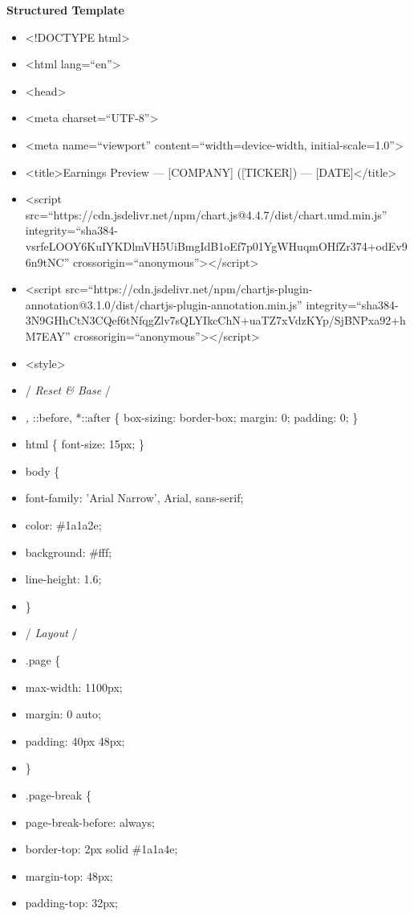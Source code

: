 \documentclass[11pt]{article}
\begin{document}
\textbf{Structured Template}
\begin{itemize}[leftmargin=*,itemsep=2pt,topsep=2pt]
\item {} <!DOCTYPE html>
\item {} <html lang=``en''>
\item {} <head>
\item {} <meta charset=``UTF-8''>
\item {} <meta name=``viewport'' content=``width=device-width, initial-scale=1.0''>
\item {} <title>Earnings Preview — [COMPANY] ([TICKER]) — [DATE]</title>
\item {} <script src=``https://cdn.jsdelivr.net/npm/chart.js@4.4.7/dist/chart.umd.min.js'' integrity=``sha384-vsrfeLOOY6KuIYKDlmVH5UiBmgIdB1oEf7p01YgWHuqmOHfZr374+odEv96n9tNC'' crossorigin=``anonymous''></script>
\item {} <script src=``https://cdn.jsdelivr.net/npm/chartjs-plugin-annotation@3.1.0/dist/chartjs-plugin-annotation.min.js'' integrity=``sha384-3N9GHhCtN3CQef6tNfqgZlv7sQLYIkcChN+uaTZ7xVdzKYp/SjBNPxa92+hM7EAY'' crossorigin=``anonymous''></script>
\item {} <style>
\item {} /\emph{ Reset \& Base }/
\item {} \emph{, }::before, *::after \{ box-sizing: border-box; margin: 0; padding: 0; \}
\item {} html \{ font-size: 15px; \}
\item {} body \{
\item {} font-family: 'Arial Narrow', Arial, sans-serif;
\item {} color: \#1a1a2e;
\item {} background: \#fff;
\item {} line-height: 1.6;
\item {} \}
\item {} /\emph{ Layout }/
\item {} .page \{
\item {} max-width: 1100px;
\item {} margin: 0 auto;
\item {} padding: 40px 48px;
\item {} \}
\item {} .page-break \{
\item {} page-break-before: always;
\item {} border-top: 2px solid \#1a1a4e;
\item {} margin-top: 48px;
\item {} padding-top: 32px;

\end{itemize}
\end{document}

